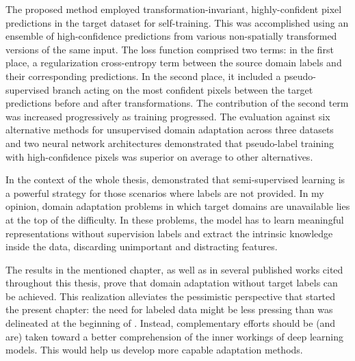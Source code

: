 The proposed method employed transformation-invariant, highly-confident pixel predictions in the target dataset for self-training. This was accomplished using an ensemble of high-confidence predictions from various non-spatially transformed versions of the same input. The loss function comprised two terms: in the first place, a regularization cross-entropy term between the source domain labels and their corresponding predictions. In the second place, it included a pseudo-supervised branch acting on the most confident pixels between the target predictions before and after transformations. The contribution of the second term was increased progressively as training progressed. The evaluation against six alternative methods for unsupervised domain adaptation across three datasets and two neural network architectures demonstrated that pseudo-label training with high-confidence pixels was superior on average to other alternatives.  

In the context of the whole thesis,  demonstrated that semi-supervised learning is a powerful strategy for those scenarios where labels are not provided. In my opinion, domain adaptation problems in which target domains are unavailable lies at the top of the difficulty. In these problems, the model has to learn meaningful representations without supervision labels and extract the intrinsic knowledge inside the data, discarding unimportant and distracting features.

The results in the mentioned chapter, as well as in several published works cited throughout this thesis, prove that domain adaptation without target labels can be achieved. This realization alleviates the pessimistic perspective that started the present chapter: the need for labeled data might be less pressing than was delineated at the beginning of . Instead, complementary efforts should be (and are) taken toward a better comprehension of the inner workings of deep learning models. This would help us develop more capable adaptation methods.